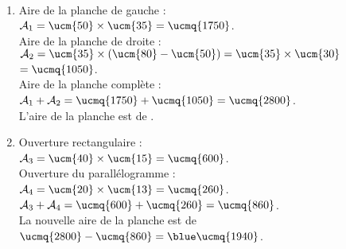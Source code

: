 \begin{colonne*exercice}
\begin{corrige}
   \ \\ [-5mm]
   \begin{enumerate}
      \item Aire de la planche de gauche : \\
      $\mathcal{A}_1 =\ucm{50}\times\ucm{35} =\ucmq{1750}$. \\
         Aire de la planche de droite : \\
         $\mathcal{A}_2 =\ucm{35}\times(\ucm{80}-\ucm{50}) =\ucm{35}\times\ucm{30}$ \\
         $=\ucmq{1050}$. \\
         Aire de la planche complète : \\
         $\mathcal{A}_1+\mathcal{A}_2 =\ucmq{1750}+\ucmq{1050} =\ucmq{2800}$. \\
         L'aire de la planche est de {\blue {}}.
      \item Ouverture rectangulaire : \\
         $\mathcal{A}_3 =\ucm{40}\times\ucm{15} =\ucmq{600}$. \\
         Ouverture du parallélogramme : \\
         $\mathcal{A}_4 =\ucm{20}\times\ucm{13} =\ucmq{260}$. \\
         $\mathcal{A}_3+\mathcal{A}_4 =\ucmq{600}+\ucmq{260} =\ucmq{860}$. \\
         La nouvelle aire de la planche est de \\
         $\ucmq{2800}-\ucmq{860} ={\blue \ucmq{1940}}$.
   \end{enumerate}
   \end{corrige}

\end{colonne*exercice}


\Recreation

